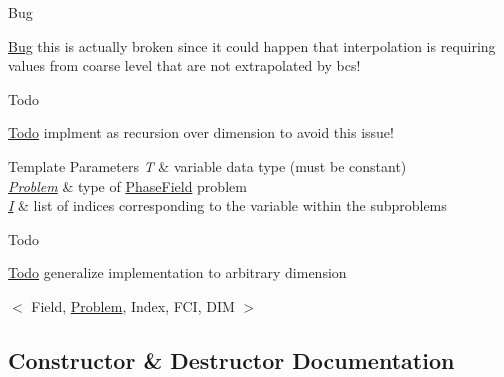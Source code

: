 \begin{DoxyRefDesc}{Bug}
\item[\hyperlink{bug__bug000001}{Bug}]this is actually broken since it could happen that interpolation is requiring values from coarse level that are not extrapolated by bcs! \end{DoxyRefDesc}
\begin{DoxyRefDesc}{Todo}
\item[\hyperlink{todo__todo000004}{Todo}]implment as recursion over dimension to avoid this issue!\end{DoxyRefDesc}



\begin{DoxyTemplParams}{Template Parameters}
{\em T} & variable data type (must be constant) \\
\hline
{\em \hyperlink{classUintah_1_1PhaseField_1_1Problem}{Problem}} & type of \hyperlink{namespaceUintah_1_1PhaseField}{Phase\+Field} problem \\
\hline
{\em \hyperlink{structUintah_1_1PhaseField_1_1I}{I}} & list of indices corresponding to the variable within the subproblems\\
\hline
\end{DoxyTemplParams}
\begin{DoxyRefDesc}{Todo}
\item[\hyperlink{todo__todo000005}{Todo}]generalize implementation to arbitrary dimension\end{DoxyRefDesc}


$<$ Field, \hyperlink{classUintah_1_1PhaseField_1_1Problem}{Problem}, Index, F\+CI, D\+IM $>$ 

\subsection{Constructor \& Destructor Documentation}
\mbox{\label{classUintah_1_1PhaseField_1_1detail_1_1amr__interpolator_3_01ScalarField_3_01T_01_4_00_01Problemdf68628a6010a1e1526666730125c372_a979f58156a77c56eeff8e548f8886dd3}} 
